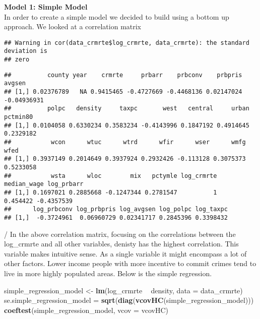 \documentclass[
]{article}
\newenvironment{Shaded}{\begin{snugshade}}{\end{snugshade}}
\newcommand{\CommentTok}[1]{\textcolor[rgb]{0.56,0.35,0.01}{\textit{#1}}}
\newcommand{\DataTypeTok}[1]{\textcolor[rgb]{0.13,0.29,0.53}{#1}}
\newcommand{\KeywordTok}[1]{\textcolor[rgb]{0.13,0.29,0.53}{\textbf{#1}}}
\newcommand{\NormalTok}[1]{#1}
\newcommand{\OperatorTok}[1]{\textcolor[rgb]{0.81,0.36,0.00}{\textbf{#1}}}
\newcommand{\StringTok}[1]{\textcolor[rgb]{0.31,0.60,0.02}{#1}}
\begin{document}
\textbf{Model 1: Simple Model}\\

In order to create a simple model we decided to build using a bottom up
approach. We looked at a correlation matrix

\begin{Shaded}
\end{Shaded}

\begin{verbatim}
## Warning in cor(data_crmrte$log_crmrte, data_crmrte): the standard deviation is
## zero
\end{verbatim}

\begin{verbatim}
##          county year    crmrte     prbarr    prbconv    prbpris      avgsen
## [1,] 0.02376789   NA 0.9415465 -0.4727669 -0.4468136 0.02147024 -0.04936931
##          polpc   density     taxpc       west   central     urban  pctmin80
## [1,] 0.0104058 0.6330234 0.3583234 -0.4143996 0.1847192 0.4914645 0.2329182
##           wcon      wtuc      wtrd      wfir      wser      wmfg      wfed
## [1,] 0.3937149 0.2014649 0.3937924 0.2932426 -0.113128 0.3075373 0.5233058
##           wsta      wloc        mix   pctymle log_crmrte median_wage log_prbarr
## [1,] 0.1697021 0.2885668 -0.1247344 0.2781547          1    0.454422 -0.4357539
##      log_prbconv log_prbpris log_avgsen log_polpc log_taxpc
## [1,]  -0.3724961  0.06960729 0.02341717 0.2845396 0.3398432
\end{verbatim}

/ In the above correlation matrix, focusing on the correlations between
the log\_crmrte and all other variables, denisty has the highest
correlation. This variable makes intuitive sense. As a single variable
it might encompass a lot of other factors. Lower income people with more
incentive to commit crimes tend to live in more highly populated areas.
Below is the simple regression.

\begin{Shaded}
\begin{Highlighting}[]
\NormalTok{simple_regression_model <-}\StringTok{ }\KeywordTok{lm}\NormalTok{(log_crmrte }\OperatorTok{~}\StringTok{ }\NormalTok{density, }\DataTypeTok{data =}\NormalTok{ data_crmrte)}
\NormalTok{se.simple_regression_model =}\StringTok{ }\KeywordTok{sqrt}\NormalTok{(}\KeywordTok{diag}\NormalTok{(}\KeywordTok{vcovHC}\NormalTok{(simple_regression_model)))}
\KeywordTok{coeftest}\NormalTok{(simple_regression_model, }\DataTypeTok{vcov =}\NormalTok{ vcovHC)}
\end{Highlighting}
\end{Shaded}
\end{document}
